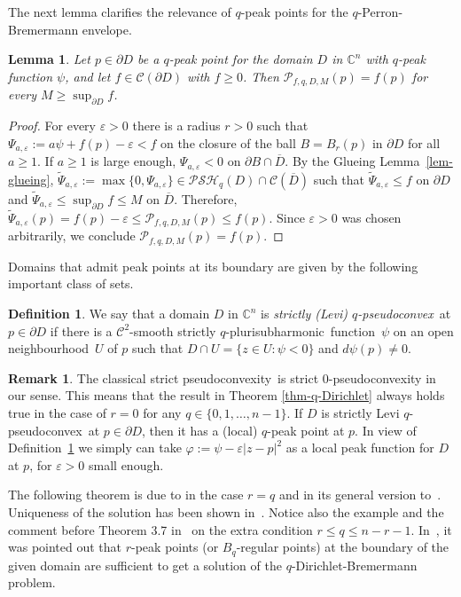 \documentclass[reqno]{amsart}
\newtheorem{lem}[thm]{Lemma}
\theoremstyle{definition}
\newtheorem{defn}[thm]{Definition}
\newtheorem{rem}[thm]{Remark}
\numberwithin{equation}{section}
\newcommand{\cbb}{\mathbb{C}}
\newcommand{\ccal}{\mathcal{C}}
\newcommand{\pcal}{\mathcal{P}}
\newcommand{\sqpsh}{strictly $q$-pluri\-sub\-harmonic}
\newcommand{\PSH}{\mathcal{PSH}}
\newcommand{\qpsc}{$q$-pseudo\-convex}
\newcommand{\spscy}{strict pseudoconvexity}
\newcommand{\nbh}{neighbourhood}
\newcommand{\fct}{function}
\newcommand{\cld}{\overline{D}}
\newcommand{\eps}{\varepsilon}
\begin{document}
The next lemma clarifies the relevance of $q$-peak points for the $q$-Perron-Bremermann envelope.

\begin{lem}\label{lem-q-peak} Let $p \in \partial D$ be a $q$-peak point for the domain $D$ in $\cbb^n$ with $q$-peak function $\psi$, and let $f \in \ccal(\partial D)$ with $f \geq0$. Then $\pcal_{f,q,D,M}(p) = f(p)$ for every $M \geq \sup_{\partial D} f$.
\end{lem}

\begin{proof} For every $\eps>0$ there is a radius $r>0$ such that $\Psi_{a,\eps}:=a\psi+f(p)-\eps < f$ on the closure of the ball $B=B_r(p)$ in $\partial D$ for all $a\geq1$. If $a\geq1$ is large enough, $\Psi_{a,\eps} < 0$ on $\partial B \cap \cld$. By the Glueing Lemma~\ref{lem-glueing}, $\widetilde{\Psi}_{a,\eps}:=\max\{0,\Psi_{a,\eps}\} \in \PSH_q(D)\cap\ccal(\cld)$ such that $\widetilde{\Psi}_{a,\eps} \leq f$ on $\partial D$ and $\widetilde{\Psi}_{a,\eps} \leq \sup_{\partial D} f \leq M$ on $\cld$. Therefore, $\widetilde{\Psi}_{a,\eps}(p)=f(p)-\eps \leq \pcal_{f,q,D,M}(p) \leq f(p)$. Since $\eps>0$ was chosen arbitrarily, we conclude $\pcal_{f,q,D,M}(p) = f(p)$.
\end{proof}

Domains that admit peak points at its boundary are given by the following important class of sets.

\begin{defn}\label{defn-sqpsc} We say that a domain $D$ in $\cbb^n$ is \textit{strictly (Levi) \qpsc}\ at $p \in \partial D$ if there is a $\ccal^2$-smooth \sqpsh\ \fct\ $\psi$ on an open \nbh\ $U$ of $p$ such that $D \cap U=\{z \in U : \psi<0\}$ and $d\psi(p)\neq 0$.
\end{defn}

\begin{rem}\label{rem-q-Dirichlet} The classical \spscy\ is strict $0$-pseudoconvexity in our sense. This means that the result in Theorem \ref{thm-q-Dirichlet} always holds true in the case of $r=0$ for any $q \in \{0,1,\ldots,n-1\}$. If $D$ is strictly Levi \qpsc\ at $p \in \partial D$, then it has a (local) $q$-peak point at $p$. In view of Definition~\ref{defn-sqpsc} we simply can take $\varphi:=\psi-\eps|z-p|^2$ as a local peak function for $D$ at $p$, for $\eps>0$ small enough.
\end{rem}

The following theorem is due to \cite{HM} in the case $r=q$ and in its general version to~\cite{Ka}. Uniqueness of the solution has been shown in~\cite{Sl84}. Notice also the example and the comment before Theorem 3.7 in~\cite{Bu} on the extra condition $r \leq q \leq n-r-1$. In~\cite{Dieu}, it was pointed out that $r$-peak points (or $B_q$-regular points) at the boundary of the given domain  are sufficient to get a solution of the $q$-Dirichlet-Bremermann problem.
\end{document}
